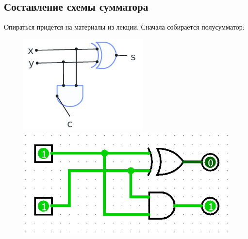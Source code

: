 \subsection{Составление схемы сумматора}
Опираться придется на материалы из лекции.
Сначала собирается полусумматор:
\begin{figure}[H]
    \centering
    \begin{minipage}{0.35\linewidth} %
        \centering
        \includegraphics[width=\linewidth]{Progress/semi-adder.png}
    \end{minipage}%
    \hspace{0.05\linewidth} %
    \begin{minipage}{0.45\linewidth} %
        \centering
        \includegraphics[width=\linewidth]{Progress/semi-adder1.png}
    \end{minipage}
\end{figure}
